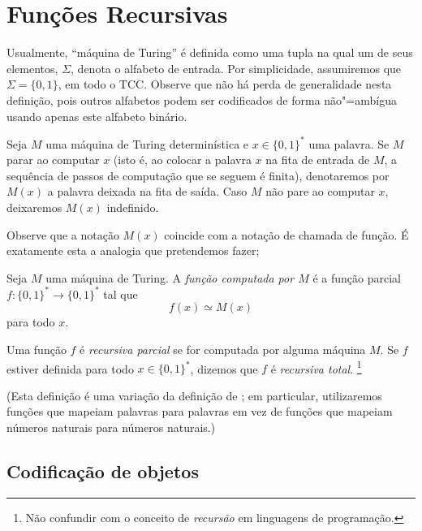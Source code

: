 \section{Funções Recursivas}

Usualmente,
``máquina de Turing'' é definida como uma tupla
na qual um de seus elementos,
$\Sigma$,
denota o alfabeto de entrada.
Por simplicidade,
assumiremos que $\Sigma = \{0, 1\}$,
em todo o TCC.
Observe que não há perda de generalidade nesta definição,
pois outros alfabetos podem ser codificados de forma não"=ambígua
usando apenas este alfabeto binário.

\begin{notation}
    Seja $M$ uma máquina de Turing determinística
    e $x \in \{0, 1\}^*$ uma palavra.
    Se $M$ parar ao computar $x$
    (isto é,
    ao colocar a palavra $x$ na fita de entrada de $M$,
    a sequência de passos de computação que se seguem é finita),
    denotaremos por $M(x)$ a palavra deixada na fita de saída.
    Caso $M$ não pare ao computar $x$,
    deixaremos $M(x)$ indefinido.
\end{notation}

Observe que a notação $M(x)$ coincide com a notação de chamada de função.
É exatamente esta a analogia que pretendemos fazer;

\begin{definition}
    \label{def:recursive_function}
    Seja $M$ uma máquina de Turing.
    A \emph{função computada por $M$}
    é a função parcial $f: \{0, 1\}^* \to \{0, 1\}^*$ tal que
    \begin{equation*}
        f(x) \simeq M(x)
    \end{equation*}
    para todo $x$.

    Uma função $f$ é \emph{recursiva parcial}
    se for computada por alguma máquina $M$.
    Se $f$ estiver definida para todo $x \in \{0, 1\}^*$,
    dizemos que $f$ é \emph{recursiva total}.
    \footnote{
        Não confundir com o conceito de \emph{recursão} em linguagens de programação.
    }
\end{definition}
(Esta definição é uma variação da definição de ;
em particular, utilizaremos funções que mapeiam palavras para palavras
em vez de funções que mapeiam números naturais para números naturais.)

\subsection{Codificação de objetos}
\label{sec:binary_encoding}

